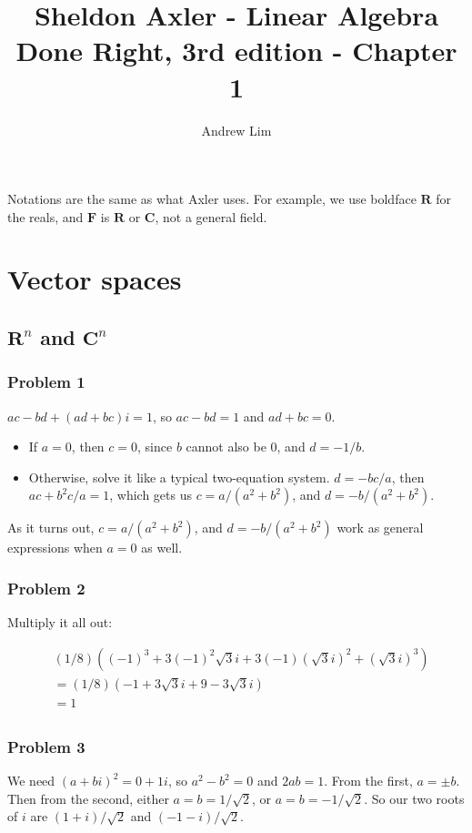 \documentclass{article}
\begin{document}
\title{Sheldon Axler - Linear Algebra Done Right, 3rd edition - Chapter 1}
\author{Andrew Lim}

\def \problem#1{\subsubsection*{Problem #1}}
\def \real{\mathbf{R}}
\def \complex{\mathbf{C}}
\def \field{\mathbf{F}}

Notations are the same as what Axler uses. For example, we use boldface $\real$
for the reals, and $\field$ is $\real$ or $\complex$, not a general field.

\section{Vector spaces}

\subsection{$\real^n$ and $\complex^n$}

\problem{1}

$ac - bd + (ad + bc)i = 1$, so $ac - bd = 1$ and $ad + bc = 0$.

\begin{itemize}
\item If $a = 0$, then $c = 0$, since $b$ cannot also be 0, and $d = -1/b$.
\item Otherwise, solve it like a typical two-equation system. $d = -bc/a$, then
  $ac + b^2c/a = 1$, which gets us $c = a/(a^2+b^2)$, and $d = -b/(a^2+b^2)$.
\end{itemize}

As it turns out, $c = a/(a^2+b^2)$, and $d = -b/(a^2+b^2)$ work as general
expressions when $a = 0$ as well.

\problem{2}

Multiply it all out:

\begin{align*}
  & (1/8)((-1)^3 + 3(-1)^2\sqrt{3}i + 3(-1)(\sqrt{3}i)^2 + (\sqrt{3}i)^3) \\
  & = (1/8)(-1 + 3\sqrt{3}i + 9 - 3\sqrt{3}i) \\
  & = 1 \\
\end{align*}

\problem{3}

We need $(a+bi)^2 = 0+1i$, so $a^2 - b^2 = 0$ and $2ab = 1$. From the first,
$a = \pm b$. Then from the second, either $a = b = 1/\sqrt{2}$, or $a = b =
-1/\sqrt{2}$. So our two roots of $i$ are $(1 + i)/\sqrt{2}$ and $(-1 -
i)/\sqrt{2}$.
\end{document}
